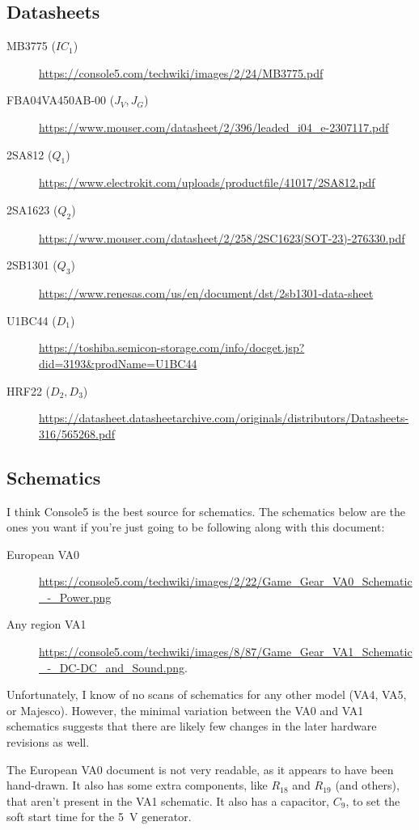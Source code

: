 \documentclass{article}
\newcommand{\model}{\textsf}
\begin{document}
\subsection{Datasheets}
\begin{description}
\item[\model{MB3775} ($IC_1$)]
  \url{https://console5.com/techwiki/images/2/24/MB3775.pdf}
\item[\model{FBA04VA450AB-00} ($J_V,J_G$)]
  \url{https://www.mouser.com/datasheet/2/396/leaded_i04_e-2307117.pdf}
\item[\model{2SA812} ($Q_1$)]
  \url{https://www.electrokit.com/uploads/productfile/41017/2SA812.pdf}
\item[\model{2SA1623} ($Q_2$)]
  \url{https://www.mouser.com/datasheet/2/258/2SC1623(SOT-23)-276330.pdf}
\item[\model{2SB1301} ($Q_3$)]
  \url{https://www.renesas.com/us/en/document/dst/2sb1301-data-sheet}
\item[\model{U1BC44} ($D_1$)]
  \url{https://toshiba.semicon-storage.com/info/docget.jsp?did=3193&prodName=U1BC44}
  
\item[\model{HRF22} ($D_2,D_3$)]
  \url{https://datasheet.datasheetarchive.com/originals/distributors/Datasheets-316/565268.pdf}
\end{description}

\subsection{Schematics}
\label{sec:documents_schematics}
I think Console5 is the best source for schematics. The schematics
below are the ones you want if you're just going to be following along
with this document:
\begin{description}
\item[European \model{VA0}]
  \url{https://console5.com/techwiki/images/2/22/Game_Gear_VA0_Schematic_-_Power.png}
\item[Any region \model{VA1}]
  \url{https://console5.com/techwiki/images/8/87/Game_Gear_VA1_Schematic_-_DC-DC_and_Sound.png}.
\end{description}

Unfortunately, I know of no scans of schematics for any other model
(\model{VA4}, \model{VA5}, or Majesco). However, the minimal variation
between the \model{VA0} and \model{VA1} schematics suggests that there
are likely few changes in the later hardware revisions as well.

The European \model{VA0} document is not very readable, as it appears
to have been hand-drawn. It also has some extra components, like
$R_{18}$ and $R_{19}$ (and others), that aren't present in the
\model{VA1} schematic. It also has a capacitor, $C_9$, to set the soft
start time for the \qty{5}{\volt} generator.
\end{document}
